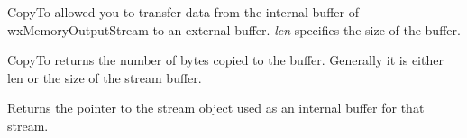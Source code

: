 
CopyTo allowed you to transfer data from the internal buffer of
wxMemoryOutputStream to an external buffer. {\it len} specifies the size of
the buffer.


CopyTo returns the number of bytes copied to the buffer. Generally it is either
len or the size of the stream buffer.

\label{wxmemoryoutputstreamgetostrmbuf}


Returns the pointer to the stream object used as an internal buffer
for that stream.

